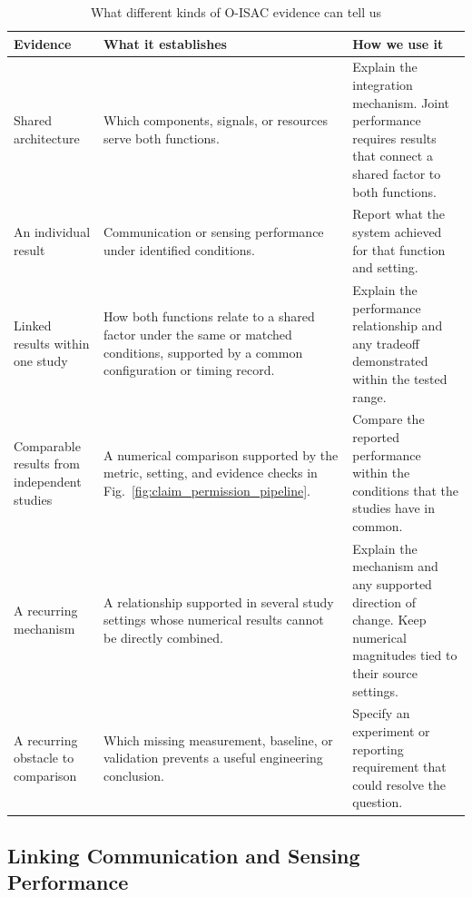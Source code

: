 \begin{table}[!t]
\caption{What different kinds of O-ISAC evidence can tell us}
\label{tab:comparison_record}
\centering
\footnotesize
\setlength{\tabcolsep}{4pt}
\renewcommand{\arraystretch}{1.15}
\begin{tabularx}{\textwidth}{@{}>{\raggedright\arraybackslash}p{}
>{\raggedright\arraybackslash}p{}
>{\raggedright\arraybackslash}X@{}}
\toprule
Evidence & What it establishes & How we use it \\
\midrule
Shared architecture &
Which components, signals, or resources serve both functions. &
Explain the integration mechanism. Joint performance requires results
that connect a shared factor to both functions. \\
\addlinespace[3pt]
An individual result &
Communication or sensing performance under identified conditions. &
Report what the system achieved for that function and setting. \\
\addlinespace[3pt]
Linked results within one study &
How both functions relate to a shared factor under the same or matched
conditions, supported by a common configuration or timing record. &
Explain the performance relationship and any tradeoff demonstrated within
the tested range. \\
\addlinespace[3pt]
Comparable results from independent studies &
A numerical comparison supported by the metric, setting, and evidence
checks in Fig.~\ref{fig:claim_permission_pipeline}. &
Compare the reported performance within the conditions that the studies
have in common. \\
\addlinespace[3pt]
A recurring mechanism &
A relationship supported in several study settings whose numerical results
cannot be directly combined. &
Explain the mechanism and any supported direction of change.
Keep numerical magnitudes tied to their source settings. \\
\addlinespace[3pt]
A recurring obstacle to comparison &
Which missing measurement, baseline, or validation prevents a useful
engineering conclusion. &
Specify an experiment or reporting requirement that could resolve the
question. \\
\bottomrule
\end{tabularx}
\end{table}

\subsection{Linking Communication and Sensing Performance}

